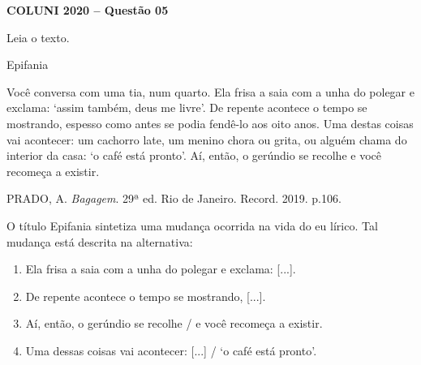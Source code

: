 \textbf{COLUNI 2020 -- Questão 05}\par\medskip Leia o texto.

\par

Epifania

\par

Você conversa com uma tia, num quarto. Ela frisa a saia com a unha do polegar e exclama: ‘assim também, deus me livre’. De repente acontece o tempo se mostrando, espesso como antes se podia fendê-lo aos oito anos. Uma destas coisas vai acontecer: um cachorro late, um menino chora ou grita, ou alguém chama do interior da casa: ‘o café está pronto’. Aí, então, o gerúndio se recolhe e você recomeça a existir.

\par

PRADO, A. \textit{Bagagem}. 29ª ed. Rio de Janeiro. Record. 2019. p.106.

\par

O título Epifania sintetiza uma mudança ocorrida na vida do eu lírico. Tal mudança está descrita na alternativa:\begin{enumerate}
\item Ela frisa a saia com a unha do polegar e exclama: [...].
\item De repente acontece o tempo se mostrando, [...].
\item Aí, então, o gerúndio se recolhe / e você recomeça a existir.
\item Uma dessas coisas vai acontecer: [...] / ‘o café está pronto’.\end{enumerate}
